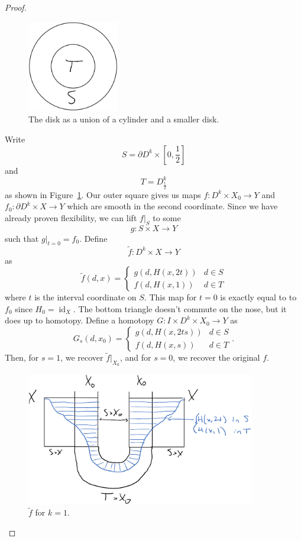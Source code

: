 \documentclass{article}
\newtheorem{proposed work}[theorem]{Proposed Work}
\theoremstyle{definition}
\DeclareMathOperator{\id}{id}
\begin{document}
\begin{proof}
\begin{figure}[h]
  \centering
  \includegraphics[width=4cm]{disk_s_t}
    \caption{The disk as a union of a cylinder and a smaller disk.\label{fig:disk_s_t}}
\end{figure}
Write 
\[
S = \partial D^k\times \left[0,\frac12\right]
\]
and
\[
T = D^k_{\tfrac12} 
\]
as shown in Figure~\ref{fig:disk_s_t}.
Our outer square gives us maps $f: D^k\times X_0\to Y$ and $f_0: \partial D^k\times X\to Y$ which are smooth in the second coordinate. Since we have already proven flexibility, we can lift $f|_S$ to some
\[
  g: S\times X \to Y
\]
such that $g|_{t=0}=f_0$. Define
\[
  \tilde f: D^k\times X\to Y
\]
as 
\[
  \tilde f(d, x) =
  \begin{cases}
    g(d, H(x,2t)) & d\in S\\
    f(d, H(x,1)) & d\in T
  \end{cases}
\]
where $t$ is the interval coordinate on $S$.
This map for $t=0$ is exactly equal to to $f_0$ since $H_0 = \id_X$. The bottom triangle doesn't commute on the nose, but it does up to homotopy. Define a homotopy $G: I\times D^k\times X_0 \to Y$ as
\[
G_s(d,x_0) =   \begin{cases}
    g(d, H(x,2ts)) & d\in S\\
    f(d, H(x,s)) & d\in T
  \end{cases}.
\]
Then, for $s=1$, we recover $\tilde f|_{X_0}$, and for $s=0$, we recover the original $f$.
\begin{figure}[h]
  \centering
  \includegraphics[width=10cm]{htpy_invariant}
  \caption{$\tilde f$ for $k=1$.}
\end{figure}
\end{proof}
\end{document}
